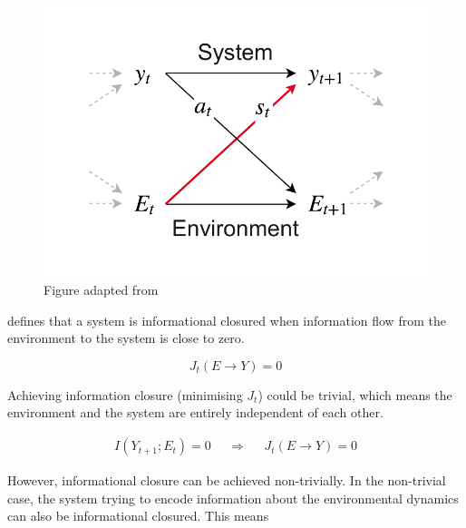 \documentclass[utf8]{article}
\begin{document}
				\begin{figure}
					\includegraphics[width=\textwidth]{WritingMaterials/SystemAndEnv.pdf} 
					\caption{Figure adapted from \cite{BERTSCHINGER.2006}}
					\label{fig:SystemAndEnv}	
				\end{figure}
		
			
			\noindent
			\cite{BERTSCHINGER.2006} defines that a system is informational closured when information flow from the environment to the system is close to zero.
		
				\begin{equation}
				J_{t}(E \rightarrow Y )=0
				\end{equation}


			\noindent 
			Achieving information closure (minimising $J_t$) could be trivial, which means the environment and the system are entirely independent of each other.
			
				\begin{equation}
				\begin{aligned}
				{I(Y_{t+1};E_{t})=0}&&{\Rightarrow}&&{J_{t}(E \rightarrow Y )=0}
				\end{aligned}
				\end{equation}


			\noindent 
			However, informational closure can be achieved non-trivially. In the non-trivial case, the system trying to encode information about the environmental dynamics can also be informational closured. This means
			
\end{document}
